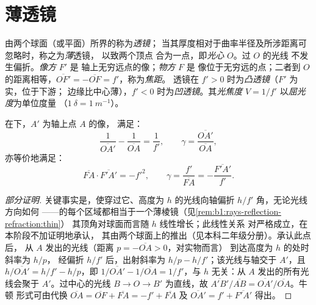 \section{薄透镜}

\begin{definition}[薄透镜]\label{def:b1:mirrors-thin-lenses:lens}
由两个球面（或平面）所界的称为\emph{透镜}；
当其厚度相对于曲率半径及所涉距离可忽略时，称之为\emph{薄}透镜，
以致两个顶点
合为一点，即\emph{光心} $O$。过 $O$ 的光线
不发生偏折。\emph{像方} $F'$ 是
轴上无穷远点的像；\emph{物方} $F$ 是
像位于无穷远的点；二者到
$O$ 的距离相等，$\overline{OF'} = -\overline{OF} = f'$，称为\emph{焦距}。
透镜在 $f' > 0$ 时为\emph{凸透镜}（$F'$ 为实，位于下游；
边缘比中心薄），$f' < 0$ 时为\emph{凹透镜}。其\emph{光焦度}
$V = 1/f'$ 以\emph{屈光度}为单位度量
（$\qty{1}{\delta} = \qty{1}{m^{-1}}$）。
\end{definition}

\begin{theorem}[薄透镜的共轭关系]\label{thm:b1:mirrors-thin-lenses:lensconj}
在下，$A'$ 为轴上点 $A$ 的像，
满足：
\[
\frac{1}{\overline{OA'}} - \frac{1}{\overline{OA}} = \frac{1}{f'},
\qquad
\gamma = \frac{\overline{OA'}}{\overline{OA}},
\]
亦等价地满足：
\[
\overline{FA}\cdot\overline{F'A'} = -f'^2,
\qquad
\gamma = \frac{f'}{\overline{FA}} = -\frac{\overline{F'A'}}{f'} .
\]
\end{theorem}

\begin{proof}[部分证明]
关键事实是，使穿过它、高度为
$h$ 的光线向轴偏折 $h/f'$ 角，无论光线方向如何
——的每个区域都相当于一个薄棱镜（见\cref{rem:b1:rays-reflection-refraction:thin}）
其顶角对球面而言随 $h$ 线性增长；此线性关系
对严格成立，在本阶段不加证明地承认，
其由两个球面上的推出（见本科二年级分册）。承认此点后，
从 $A$ 发出的光线（距离 $p = -\overline{OA} > 0$，对实物而言）
到达高度为 $h$ 的处时斜率为 $h/p$，
经偏折 $h/f'$ 后，出射斜率为 $h/p - h/f'$；该光线与轴交于
$A'$，且 $h/\overline{OA'} = h/f' - h/p$，即 $1/\overline{OA'}
- 1/\overline{OA} = 1/f'$，与 $h$ 无关：从 $A$ 发出的所有光线会聚于
$A'$。过中心的光线 $B \to O \to B'$ 为直线，故
$\overline{A'B'}/\overline{AB} = \overline{OA'}/\overline{OA}$。牛顿
形式可由代换 $\overline{OA} = \overline{OF} + \overline{FA}
= -f' + \overline{FA}$ 及 $\overline{OA'} = f' + \overline{F'A'}$ 得出。
\end{proof}

